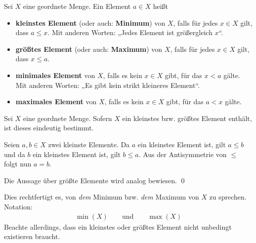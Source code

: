 \begin{defin} \label{def:kleinstes}      
Sei $X$ eine geordnete Menge. Ein Element $a\in X$ heißt
    \begin{itemize}
        \item \textbf{kleinstes Element} (oder auch: \textbf{Minimum}) von $X$, falls für jedes $x\in X$ gilt, dass $a\le x$. Mit anderen Worten: „Jedes Element ist größergleich $x$“.
        \item \textbf{größtes Element} (oder auch: \textbf{Maximum}) von $X$, falls für jedes $x\in X$ gilt, dass $x\le a$.
        \item \textbf{minimales Element} von $X$, falls es kein $x\in X$ gibt, für das $x<a$ gälte. Mit anderen Worten: „Es gibt kein strikt kleineres Element“.
        \item \textbf{maximales Element} von $X$, falls es kein $x\in X$ gibt, für das $a<x$ gälte.
    \end{itemize}
\end{defin}


\begin{satz} \label{kleinsteseind}
    Sei $X$ eine geordnete Menge. Sofern $X$ ein kleinstes bzw. größtes Element enthält, ist dieses eindeutig bestimmt.
\end{satz}
    
    
\begin{bew}
    Seien $a,b\in X$ zwei kleinste Elemente. Da $a$ ein kleinstes Element ist, gilt $a\le b$ und da $b$ ein kleinstes Element ist, gilt $b\le a$. Aus der Antisymmetrie von $\le$ folgt nun $a=b$.

    Die Aussage über größte Elemente wird analog bewiesen. \qed
\end{bew}


\begin{nota}
    Dies rechtfertigt es, von \emph{dem} Minimum bzw. \emph{dem} Maximum von $X$ zu sprechen. Notation:
    \begin{align*}
        \min(X) \qquad\text{und}\qquad \max(X)
    \end{align*}
    Beachte allerdings, dass ein kleinstes oder größtes Element nicht unbedingt existieren braucht.
\end{nota}



